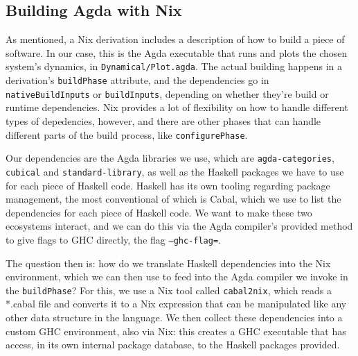 \subsection{Building Agda with Nix}

As mentioned, a Nix derivation includes a description of how to build a piece of software. In our case, this is the Agda executable that runs and plots the chosen system's dynamics, in \texttt{Dynamical/Plot.agda}. The actual building happens in a derivation's \texttt{buildPhase} attribute, and the dependencies go in \texttt{nativeBuildInputs} or \texttt{buildInputs}, depending on whether they're build or runtime dependencies. Nix provides a lot of flexibility on how to handle different types of depedencies, however, and there are other phases that can handle different parts of the build process, like \texttt{configurePhase}.

Our dependencies are the Agda libraries we use, which are \texttt{agda-categories}, \texttt{cubical} and \texttt{standard-library}, as well as the Haskell packages we have to use for each piece of Haskell code. Haskell has its own tooling regarding package management, the most conventional of which is Cabal, which we use to list the dependencies for each piece of Haskell code. We want to make these two ecosystems interact, and we can do this via the Agda compiler's provided method to give flags to GHC directly, the flag \texttt{--ghc-flag=}.

The question then is: how do we translate Haskell dependencies into the Nix environment, which we can then use to feed into the Agda compiler we invoke in the \texttt{buildPhase}? For this, we use a Nix tool called \texttt{cabal2nix}, which reads a *.cabal file and converts it to a Nix expression that can be manipulated like any other data structure in the language. We then collect these dependencies into a custom GHC environment, also via Nix: this creates a GHC executable that has access, in its own internal package database, to the Haskell packages provided.

